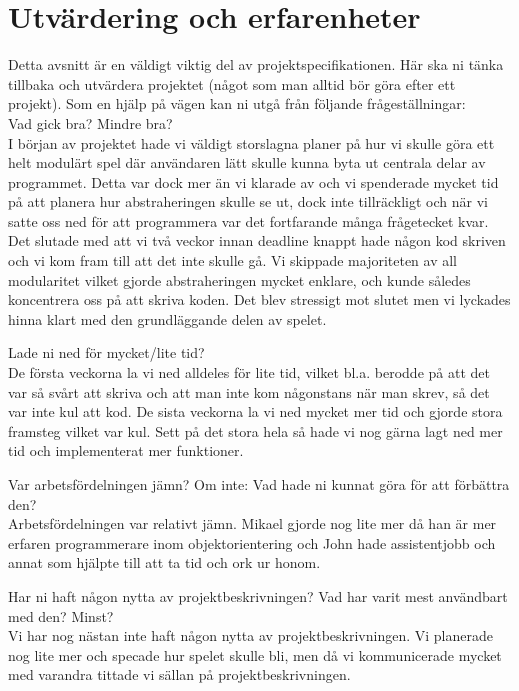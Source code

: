 \section{Utvärdering och erfarenheter}
{\color{red}Detta avsnitt är en väldigt viktig del av projektspecifikationen. Här ska ni tänka tillbaka och utvärdera projektet (något som man alltid bör göra efter ett projekt). Som en hjälp på vägen kan ni utgå från följande frågeställningar:\\
Vad gick bra? Mindre bra?\\

I början av projektet hade vi väldigt storslagna planer på hur vi skulle göra ett helt modulärt spel där användaren lätt skulle kunna byta ut centrala delar av programmet. Detta var dock mer än vi klarade av och vi spenderade mycket tid på att planera hur abstraheringen skulle se ut, dock inte tillräckligt och när vi satte oss ned för att programmera var det fortfarande många frågetecket kvar. Det slutade med att vi två veckor innan deadline knappt hade någon kod skriven och vi kom fram till att det inte skulle gå. Vi skippade majoriteten av all modularitet vilket gjorde abstraheringen mycket enklare, och kunde således koncentrera oss på att skriva koden. Det blev stressigt mot slutet men vi lyckades hinna klart med den grundläggande delen av spelet. 

Lade ni ned för mycket/lite tid?\\

De första veckorna la vi ned alldeles för lite tid, vilket bl.a. berodde på att det var så svårt att skriva och att man inte kom någonstans när man skrev, så det var inte kul att kod. De sista veckorna la vi ned mycket mer tid och gjorde stora framsteg vilket var kul. Sett på det stora hela så hade vi nog gärna lagt ned mer tid och implementerat mer funktioner.

Var arbetsfördelningen jämn? Om inte: Vad hade ni kunnat göra för att förbättra den?\\

Arbetsfördelningen var relativt jämn. Mikael gjorde nog lite mer då han är mer erfaren programmerare inom objektorientering och John hade assistentjobb och annat som hjälpte till att ta tid och ork ur honom.

Har ni haft någon nytta av projektbeskrivningen? Vad har varit mest användbart med den? Minst?\\

Vi har nog nästan inte haft någon nytta av projektbeskrivningen. Vi planerade nog lite mer och specade hur spelet skulle bli, men då vi kommunicerade mycket med varandra tittade vi sällan på projektbeskrivningen. 

}

